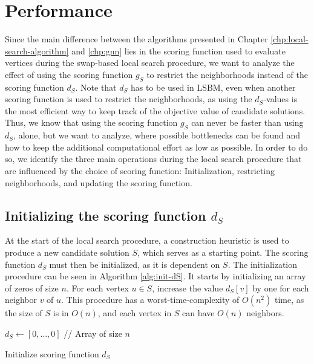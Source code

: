 \documentclass[draft,final]{vutinfth} %
\begin{document}
\section{Performance}\label{sec:performance}

Since the main difference between the algorithms presented in Chapter \ref{chp:local-search-algorithm} and \ref{chp:gnn} lies in the scoring function used to evaluate vertices during the swap-based local search procedure, we want to analyze the effect of using the scoring function $g_S$ to restrict the neighborhoods instead of the scoring function $d_S$. Note that $d_S$ has to be used in LSBM, even when another scoring function is used to restrict the neighborhoods, as using the $d_S$-values is the most efficient way to keep track of the objective value of candidate solutions. Thus, we know that using the scoring function $g_S$ can never be faster than using $d_S$, alone, but we want to analyze, where possible bottlenecks can be found and how to keep the additional computational effort as low as possible.  
In order to do so, we identify the three main operations during the local search procedure that are influenced by the choice of scoring function: Initialization, restricting neighborhoods, and updating the scoring function.  

\subsection{Initializing the scoring function $d_S$}

At the start of the local search procedure, a construction heuristic is used to produce a new candidate solution $S$, which serves as a starting point. 
The scoring function $d_S$ must then be initialized, as it is dependent on $S$. The initialization procedure can be seen in Algorithm \ref{alg:init-dS}.
It starts by initializing an array of zeros of size $n$. For each vertex $u \in S$, increase the value $d_S[v]$ by one for each neighbor $v$ of $u$. This procedure has a worst-time-complexity of $O(n^2)$ time, as the size of $S$ is in $O(n)$, and each vertex in $S$ can have $O(n)$ neighbors. 

\begin{algorithm}
    \DontPrintSemicolon
    $d_S \gets [0, \dots, 0]$ // Array of size $n$ \;
    \caption{Initialize scoring function $d_S$}
    \label{alg:init-dS}
\end{algorithm}
\end{document}
